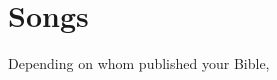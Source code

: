 \documentclass[a4paper,11pt]{article}
\begin{document}
\section{Songs} %



Depending on whom published your Bible,






{}






\end{document}
